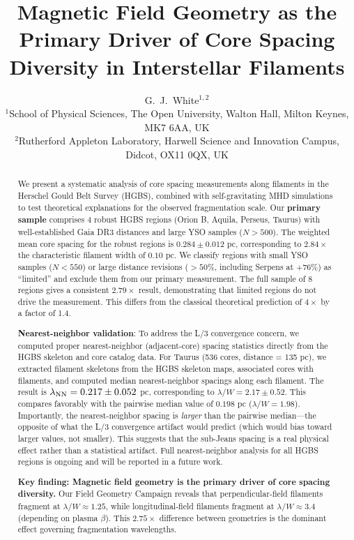 \documentclass[twoside,twocolumn]{mnras}
\title{Magnetic Field Geometry as the Primary Driver of Core Spacing Diversity in Interstellar Filaments}
\author[G.~J.~White]{G.~J.~White$^{1,2}$\\
$^{1}$School of Physical Sciences, The Open University, Walton Hall, Milton Keynes, MK7 6AA, UK\\
$^{2}$Rutherford Appleton Laboratory, Harwell Science and Innovation Campus, Didcot, OX11 0QX, UK}
\begin{document}
\maketitle

\begin{abstract}
We present a systematic analysis of core spacing measurements along filaments in the Herschel Gould Belt Survey (HGBS), combined with self-gravitating MHD simulations to test theoretical explanations for the observed fragmentation scale. Our \textbf{primary sample} comprises 4 robust HGBS regions (Orion B, Aquila, Perseus, Taurus) with well-established Gaia DR3 distances and large YSO samples ($N > 500$). The weighted mean core spacing for the robust regions is $0.284 \pm 0.012$ pc, corresponding to $2.84\times$ the characteristic filament width of $0.10$ pc. We classify regions with small YSO samples ($N < 550$) or large distance revisions ($>50\%$, including Serpens at +76\%) as ``limited'' and exclude them from our primary measurement. The full sample of 8 regions gives a consistent $2.79\times$ result, demonstrating that limited regions do not drive the measurement. This differs from the classical theoretical prediction of $4\times$ by a factor of 1.4.

\textbf{Nearest-neighbor validation}: To address the L/3 convergence concern, we computed proper nearest-neighbor (adjacent-core) spacing statistics directly from the HGBS skeleton and core catalog data. For Taurus (536 cores, distance = 135 pc), we extracted filament skeletons from the HGBS skeleton maps, associated cores with filaments, and computed median nearest-neighbor spacings along each filament. The result is $\lambda_{\rm NN} = 0.217 \pm 0.052$ pc, corresponding to $\lambda/W = 2.17 \pm 0.52$. This compares favorably with the pairwise median value of $0.198$ pc ($\lambda/W = 1.98$). Importantly, the nearest-neighbor spacing is \textit{larger} than the pairwise median—the opposite of what the L/3 convergence artifact would predict (which would bias toward larger values, not smaller). This suggests that the sub-Jeans spacing is a real physical effect rather than a statistical artifact. Full nearest-neighbor analysis for all HGBS regions is ongoing and will be reported in a future work.

\textbf{Key finding: Magnetic field geometry is the primary driver of core spacing diversity.} Our Field Geometry Campaign reveals that perpendicular-field filaments fragment at $\lambda/W \approx 1.25$, while longitudinal-field filaments fragment at $\lambda/W \approx 3.4$ (depending on plasma $\beta$). This $2.75\times$ difference between geometries is the dominant effect governing fragmentation wavelengths.


\end{abstract}
\end{document}
